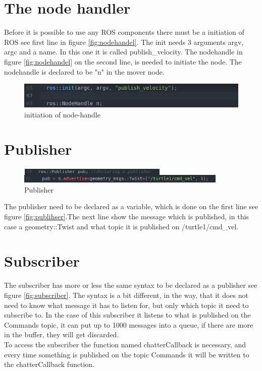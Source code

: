 \section{The node handler}
Before it is possible to use any ROS components there must be a initiation of ROS see first line in figure \ref{fig:nodehandel}. The init needs 3 arguments argv, argc and a name. In this one it is called publish\_velocity. The nodehandle in figure \ref{fig:nodehandel} on the second line, is needed to initiate the node. The nodehandle is declared to be "n" in the mover node.
\begin{figure}[h]
\begin{center}
\includegraphics[width=.9\textwidth]{figures/nodehandel.png}
\caption{initiation of node-handle}
\end{center}
\end{figure}\label{fig:nodehandel}


\section{Publisher}
\begin{figure}[h]
\begin{center}
\includegraphics[width=.9\textwidth]{figures/publisher.png}
\caption{Publisher}
\end{center}
\end{figure}\label{fig:publihser}
The publisher need to be declared as a variable, which is done on the first line see figure \ref{fig:publihser}.The next line show the message which is published, in this case a geometry::Twist and what topic it is published on /turtle1/cmd\_vel.


\section{Subscriber}
The subscriber has more or less the same syntax to be declared as a publisher see figure \ref{fig:subscriber}. The syntax is a bit different, in the way, that it does not need to know what message it has to listen for, but only which topic it need to subscribe to. In the case of this subscriber it listens to what is published on the Commands topic, it can put up to 1000 messages into a queue, if there are more in the buffer, they will get discarded.\\ 
To access the subscriber the function named chatterCallback is necessary, and every time something is published on the topic Commands it will be written to the chatterCallback function.

